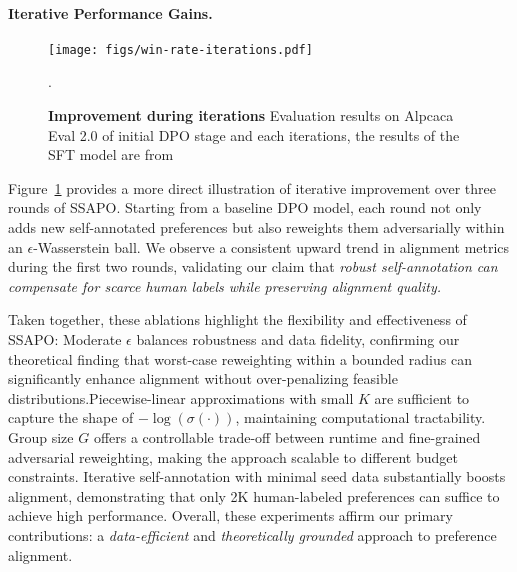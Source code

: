 \paragraph{Iterative Performance Gains.}
\begin{figure}[t]
\centering
\texttt{[image: figs/win-rate-iterations.pdf]}
\caption{\textbf{Improvement during iterations} Evaluation results on Alpcaca Eval 2.0 of initial DPO stage and each iterations, the results of the SFT model are from \cite{Kim2025Spread}}.
\label{fig:improv_dur_iters}
\end{figure}

Figure~\ref{fig:improv_dur_iters} provides a more direct illustration of iterative improvement over three rounds of SSAPO. 
Starting from a baseline DPO model, each round not only adds new self-annotated preferences but also reweights them adversarially within an $\epsilon$-Wasserstein ball. 
We observe a consistent upward trend in alignment metrics during the first two rounds, validating our claim that \emph{robust self-annotation can compensate for scarce human labels while preserving alignment quality.} 

Taken together, these ablations highlight the flexibility and effectiveness of SSAPO: Moderate $\epsilon$ balances robustness and data fidelity, confirming our theoretical finding that worst-case reweighting within a bounded radius can significantly enhance alignment without over-penalizing feasible distributions.Piecewise-linear approximations with small $K$ are sufficient to capture the shape of $-\!\log(\sigma(\cdot))$, maintaining computational tractability. Group size $G$ offers a controllable trade-off between runtime and fine-grained adversarial reweighting, making the approach scalable to different budget constraints.
 Iterative self-annotation with minimal seed data substantially boosts alignment, demonstrating that only 2K human-labeled preferences can suffice to achieve high performance. Overall, these experiments affirm our primary contributions: a \emph{data-efficient} and \emph{theoretically grounded} approach to preference alignment.
